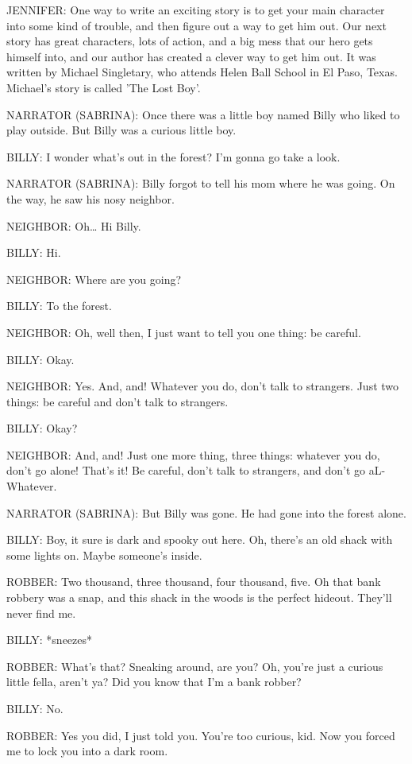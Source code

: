 JENNIFER:
One way to write an exciting story is to get your main character into some kind of trouble, and then figure out a way to get him out.
Our next story has great characters, lots of action, and a big mess that our hero gets himself into, and our author has created a clever way to get him out.
It was written by Michael Singletary, who attends Helen Ball School in El Paso, Texas.
Michael's story is called 'The Lost Boy'.

NARRATOR (SABRINA):
Once there was a little boy named Billy who liked to play outside.
But Billy was a curious little boy.

BILLY:
I wonder what's out in the forest?
I'm gonna go take a look.

NARRATOR (SABRINA):
Billy forgot to tell his mom where he was going.
On the way, he saw his nosy neighbor.

NEIGHBOR:
Oh\dots
Hi Billy.

BILLY:
Hi.

NEIGHBOR:
Where are you going?

BILLY:
To the forest.

NEIGHBOR:
Oh, well then, I just want to tell you one thing: be careful.

BILLY:
Okay.

NEIGHBOR:
Yes.
And, and!
Whatever you do, don't talk to strangers.
Just two things: be careful and don't talk to strangers.

BILLY:
Okay?

NEIGHBOR:
And, and!
Just one more thing, three things: whatever you do, don't go alone!
That's it!
Be careful, don't talk to strangers, and don't go aL-
Whatever.

NARRATOR (SABRINA):
But Billy was gone.
He had gone into the forest alone.

BILLY:
Boy, it sure is dark and spooky out here.
Oh, there's an old shack with some lights on.
Maybe someone's inside.

ROBBER:
Two thousand, three thousand, four thousand, five.
Oh that bank robbery was a snap, and this shack in the woods is the perfect hideout.
They'll never find me.

BILLY:
*sneezes*

ROBBER:
What's that?
Sneaking around, are you?
Oh, you're just a curious little fella, aren't ya?
Did you know that I'm a bank robber?

BILLY:
No.

ROBBER:
Yes you did, I just told you.
You're too curious, kid.
Now you forced me to lock you into a dark room.

